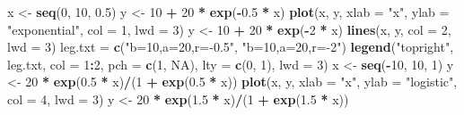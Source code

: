 \documentclass[
]{book}
\newenvironment{Shaded}{\begin{snugshade}}{\end{snugshade}}
\newcommand{\DataTypeTok}[1]{\textcolor[rgb]{0.13,0.29,0.53}{#1}}
\newcommand{\DecValTok}[1]{\textcolor[rgb]{0.00,0.00,0.81}{#1}}
\newcommand{\FloatTok}[1]{\textcolor[rgb]{0.00,0.00,0.81}{#1}}
\newcommand{\KeywordTok}[1]{\textcolor[rgb]{0.13,0.29,0.53}{\textbf{#1}}}
\newcommand{\NormalTok}[1]{#1}
\newcommand{\OperatorTok}[1]{\textcolor[rgb]{0.81,0.36,0.00}{\textbf{#1}}}
\newcommand{\OtherTok}[1]{\textcolor[rgb]{0.56,0.35,0.01}{#1}}
\newcommand{\StringTok}[1]{\textcolor[rgb]{0.31,0.60,0.02}{#1}}
\theoremstyle{definition}
\theoremstyle{definition}
\theoremstyle{definition}
\theoremstyle{remark}
\begin{document}
\begin{Shaded}
\begin{Highlighting}[]
\NormalTok{x \textless{}{-}}\StringTok{ }\KeywordTok{seq}\NormalTok{(}\DecValTok{0}\NormalTok{, }\DecValTok{10}\NormalTok{, }\FloatTok{0.5}\NormalTok{)}
\NormalTok{y \textless{}{-}}\StringTok{ }\DecValTok{10} \OperatorTok{+}\StringTok{ }\DecValTok{20} \OperatorTok{*}\StringTok{ }\KeywordTok{exp}\NormalTok{(}\OperatorTok{{-}}\FloatTok{0.5} \OperatorTok{*}\StringTok{ }\NormalTok{x)}
\KeywordTok{plot}\NormalTok{(x, y, }\DataTypeTok{xlab =} \StringTok{"x"}\NormalTok{, }\DataTypeTok{ylab =} \StringTok{"exponential"}\NormalTok{, }\DataTypeTok{col =} \DecValTok{1}\NormalTok{, }\DataTypeTok{lwd =} \DecValTok{3}\NormalTok{)}
\NormalTok{y \textless{}{-}}\StringTok{ }\DecValTok{10} \OperatorTok{+}\StringTok{ }\DecValTok{20} \OperatorTok{*}\StringTok{ }\KeywordTok{exp}\NormalTok{(}\OperatorTok{{-}}\DecValTok{2} \OperatorTok{*}\StringTok{ }\NormalTok{x)}
\KeywordTok{lines}\NormalTok{(x, y, }\DataTypeTok{col =} \DecValTok{2}\NormalTok{, }\DataTypeTok{lwd =} \DecValTok{3}\NormalTok{)}
\NormalTok{leg.txt =}\StringTok{ }\KeywordTok{c}\NormalTok{(}\StringTok{"b=10,a=20,r={-}0.5"}\NormalTok{, }\StringTok{"b=10,a=20,r={-}2"}\NormalTok{)}
\KeywordTok{legend}\NormalTok{(}\StringTok{"topright"}\NormalTok{, leg.txt, }\DataTypeTok{col =} \DecValTok{1}\OperatorTok{:}\DecValTok{2}\NormalTok{, }\DataTypeTok{pch =} \KeywordTok{c}\NormalTok{(}\DecValTok{1}\NormalTok{, }\OtherTok{NA}\NormalTok{), }\DataTypeTok{lty =} \KeywordTok{c}\NormalTok{(}\DecValTok{0}\NormalTok{, }\DecValTok{1}\NormalTok{), }\DataTypeTok{lwd =} \DecValTok{3}\NormalTok{)}
\NormalTok{x \textless{}{-}}\StringTok{ }\KeywordTok{seq}\NormalTok{(}\OperatorTok{{-}}\DecValTok{10}\NormalTok{, }\DecValTok{10}\NormalTok{, }\DecValTok{1}\NormalTok{)}
\NormalTok{y \textless{}{-}}\StringTok{ }\DecValTok{20} \OperatorTok{*}\StringTok{ }\KeywordTok{exp}\NormalTok{(}\FloatTok{0.5} \OperatorTok{*}\StringTok{ }\NormalTok{x)}\OperatorTok{/}\NormalTok{(}\DecValTok{1} \OperatorTok{+}\StringTok{ }\KeywordTok{exp}\NormalTok{(}\FloatTok{0.5} \OperatorTok{*}\StringTok{ }\NormalTok{x))}
\KeywordTok{plot}\NormalTok{(x, y, }\DataTypeTok{xlab =} \StringTok{"x"}\NormalTok{, }\DataTypeTok{ylab =} \StringTok{"logistic"}\NormalTok{, }\DataTypeTok{col =} \DecValTok{4}\NormalTok{, }\DataTypeTok{lwd =} \DecValTok{3}\NormalTok{)}
\NormalTok{y \textless{}{-}}\StringTok{ }\DecValTok{20} \OperatorTok{*}\StringTok{ }\KeywordTok{exp}\NormalTok{(}\FloatTok{1.5} \OperatorTok{*}\StringTok{ }\NormalTok{x)}\OperatorTok{/}\NormalTok{(}\DecValTok{1} \OperatorTok{+}\StringTok{ }\KeywordTok{exp}\NormalTok{(}\FloatTok{1.5} \OperatorTok{*}\StringTok{ }\NormalTok{x))}

\end{Highlighting}
\end{Shaded}
\end{document}
